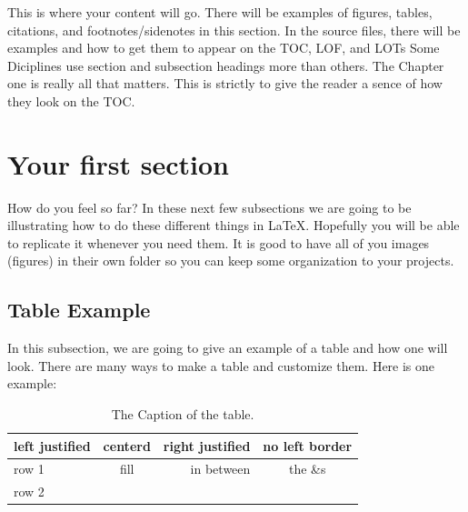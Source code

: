 \documentclass[./dissertation.tex]{subfiles}
\begin{document}
    
    This is where your content will go. There will be examples of figures, tables, citations, and footnotes/sidenotes in this section. In the source files, there will be examples and how to get them to appear on the TOC, LOF, and LOTs Some Diciplines use section and subsection headings more than others. The Chapter one is really all that matters. This is strictly to give the reader a sence of how they look on the TOC.
    \section{Your first section}
      How do you feel so far? In these next few subsections we are going to be illustrating how to do these different things in LaTeX. Hopefully you will be able to replicate it whenever you need them.
      It is good to have all of you images (figures) in their own folder so you can keep some organization to your projects.

      \subsection{Table Example}
        In this subsection, we are going to give an example of a table and how one will look. There are many ways to make a table and customize them. Here is one example:


      \begin{table}[ht]
        \centering

      \begin{tabular}[c]{|l|c|rc|}
        \hline
        left justified  & centerd  & right justified  & no left border\\
        \hline
        row 1 & fill & in between & the \&s\\
        row 2 & & &\\
        \hline
      \end{tabular}
      \caption{The Caption of the table.}
      \label{table:someTable}
      \end{table}


      \clearpage
\end{document}

